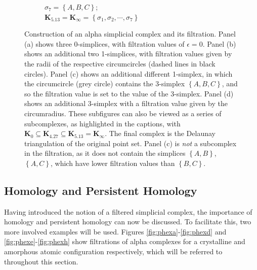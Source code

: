 \begin{figure}[tb]
\begin{subfigure}[b]{0.45\textwidth}
         \caption{$\sigma_7=\left\{A,B,C\right\}$; \\ $\mathbf{K}_{5.13}=\mathbf{K}_{\infty} = \left\{\sigma_1,\sigma_2,\cdots,\sigma_7\right\}$}
         \label{fig:phalphac}
     \end{subfigure}
     \hfill
    
	\caption{Construction of an alpha simplicial complex and its filtration. Panel (a) shows three 0\--simplices, with filtration values of $\epsilon=0$. Panel (b) shows an additional two 1\--simplices, with filtration values given by the radii of the respective circumcircles (dashed lines in black circles). Panel (c) shows an additional different 1\--simplex, in which the circumcircle (grey circle) contains the 3\--simplex $\left\{A,B,C\right\}$, and so the filtration value is set to the value of the 3\--simplex. Panel (d) shows an additional 3\--simplex with a filtration value given by the circumradius.
	These subfigures can also be viewed as a series of subcomplexes, as highlighted in the captions, with $\mathbf{K}_0\subseteq\mathbf{K}_{4.27}\subseteq\mathbf{K}_{5.13}=\mathbf{K}_\infty$. The final complex is the Delaunay triangulation of the original point set. Panel (c) is \textit{not} a subcomplex in the filtration, as it does not contain the simplices $\left\{A,B\right\}$, $\left\{A,C\right\}$, which have lower filtration values than $\left\{B,C\right\}$. }
	\label{fig:phalpha}
\end{figure}


\subsection{Homology and Persistent Homology}

Having introduced the notion of a filtered simplicial complex, the importance of homology and persistent homology can now be discussed.
To facilitate this, two more involved examples will be used.
Figures \ref{fig:phexa}\--\ref{fig:phexd} and \ref{fig:phexe}\--\ref{fig:phexh} show filtrations of alpha complexes for a crystalline and amorphous atomic configuration respectively, which will be referred to throughout this section.

